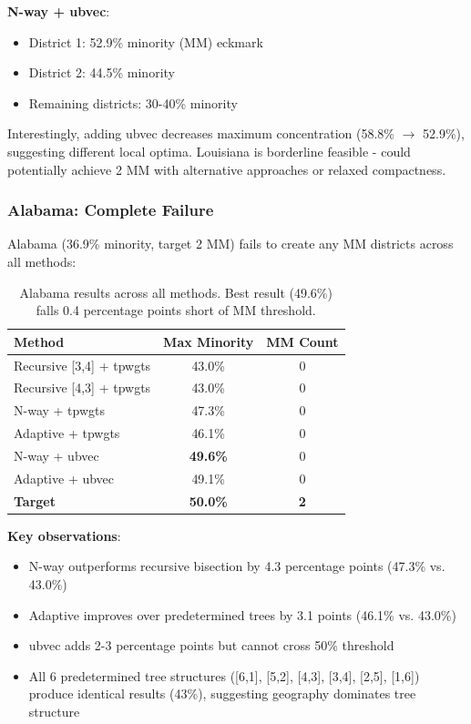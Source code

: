 \textbf{N-way + ubvec}:
\begin{itemize}
\item District 1: 52.9\% minority (MM)  eckmark
\item District 2: 44.5\% minority
\item Remaining districts: 30-40\% minority
\end{itemize}

Interestingly, adding ubvec decreases maximum concentration (58.8\% $\to$ 52.9\%), suggesting different local optima. Louisiana is borderline feasible - could potentially achieve 2 MM with alternative approaches or relaxed compactness.

\subsubsection{Alabama: Complete Failure}

Alabama (36.9\% minority, target 2 MM) fails to create any MM districts across all methods:

\begin{table}[h]
\centering
\begin{tabular}{lcc}
\toprule
Method & Max Minority & MM Count \\
\midrule
Recursive [3,4] + tpwgts & 43.0\% & 0 \\
Recursive [4,3] + tpwgts & 43.0\% & 0 \\
N-way + tpwgts & 47.3\% & 0 \\
Adaptive + tpwgts & 46.1\% & 0 \\
N-way + ubvec & \textbf{49.6\%} & 0 \\
Adaptive + ubvec & 49.1\% & 0 \\
\midrule
\textbf{Target} & \textbf{50.0\%} & \textbf{2} \\
\bottomrule
\end{tabular}
\caption{Alabama results across all methods. Best result (49.6\%) falls 0.4 percentage points short of MM threshold.}
\label{tab:alabama}
\end{table}

\textbf{Key observations}:
\begin{itemize}
\item N-way outperforms recursive bisection by 4.3 percentage points (47.3\% vs. 43.0\%)
\item Adaptive improves over predetermined trees by 3.1 points (46.1\% vs. 43.0\%)
\item ubvec adds 2-3 percentage points but cannot cross 50\% threshold
\item All 6 predetermined tree structures ([6,1], [5,2], [4,3], [3,4], [2,5], [1,6]) produce identical results (43\%), suggesting geography dominates tree structure
\end{itemize}

